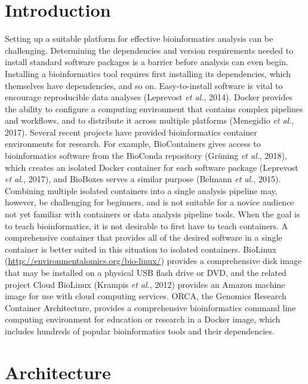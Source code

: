 \documentclass{bioinfo}
\begin{document}
\maketitle

\section{Introduction}

Setting up a suitable platform for effective bioinformatics analysis can be challenging. Determining the dependencies and version requirements needed to install standard software packages is a barrier before analysis can even begin. Installing a bioinformatics tool requires first installing its dependencies, which themselves have dependencies, and so on. Easy-to-install software is vital to encourage reproducible data analyses (Leprevost \emph{et al.}, 2014). Docker provides the ability to configure a computing environment that contains complex pipelines and workflows, and to distribute it across multiple platforms (Menegidio \emph{et al.}, 2017). Several recent projects have provided bioinformatics container environments for research. For example, BioContainers gives access to bioinformatics software from the BioConda repository (Gr\"uning \emph{et al.}, 2018), which creates an isolated Docker container for each software package (Leprevost \emph{et al.}, 2017), and BioBoxes serves a similar purpose (Belmann \emph{et al.}, 2015). Combining multiple isolated containers into a single analysis pipeline may, however, be challenging for beginners, and is not suitable for a novice audience not yet familiar with containers or data analysis pipeline tools. When the goal is to teach bioinformatics, it is not desirable to first have to teach containers. A comprehensive container that provides all of the desired software in a single container is better suited in this situation to isolated containers. BioLinux (\url{http://environmentalomics.org/bio-linux/}) provides a comprehensive disk image that may be installed on a physical USB flash drive or DVD, and the related project Cloud BioLinux (Krampis \emph{et al.}, 2012) provides an Amazon machine image for use with cloud computing services. ORCA, the Genomics Research Container Architecture, provides a comprehensive bioinformatics command line computing environment for education or research in a Docker image, which includes hundreds of popular bioinformatics tools and their dependencies.

\section{Architecture}
\end{document}
